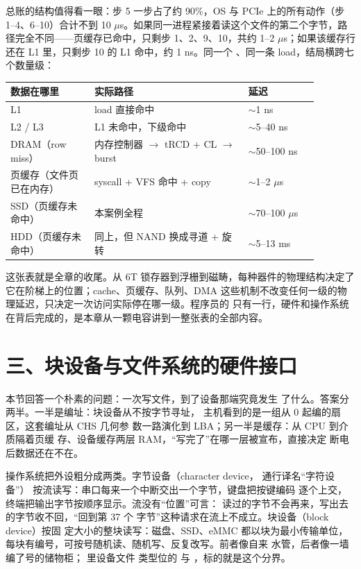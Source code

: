 总账的结构值得看一眼：步 5 一步占了约 90\%，OS 与 PCIe 上的所有动作（步 1--4、6--10）合计不到 10 $\mu$s。如果同一进程紧接着读这个文件的第二个字节，路径完全不同——页缓存已命中，只剩步 1、2、9、10，共约 1--2 $\mu$s；如果该缓存行还在 L1 里，只剩步 10 的 L1 命中，约 1 ns。同一个 、同一条 load，结局横跨七个数量级：

\begin{longtable}{L{0.24\linewidth}L{0.44\linewidth}L{0.20\linewidth}}
\toprule
数据在哪里 & 实际路径 & 延迟 \\
\midrule
L1 & load 直接命中 & $\sim$1 ns \\\tablerowrule
L2 / L3 & L1 未命中，下级命中 & $\sim$5--40 ns \\\tablerowrule
DRAM（row miss） & 内存控制器 $\to$ tRCD + CL $\to$ burst & $\sim$50--100 ns \\\tablerowrule
页缓存（文件页已在内存） & syscall + VFS 命中 + copy & $\sim$1--2 $\mu$s \\\tablerowrule
SSD（页缓存未命中） & 本案例全程 & $\sim$70--100 $\mu$s \\\tablerowrule
HDD（页缓存未命中） & 同上，但 NAND 换成寻道 + 旋转 & $\sim$5--13 ms \\
\bottomrule
\end{longtable}

这张表就是全章的收尾。从 6T 锁存器到浮栅到磁畴，每种器件的物理结构决定了它在阶梯上的位置；cache、页缓存、队列、DMA 这些机制不改变任何一级的物理延迟，只决定一次访问实际停在哪一级。程序员的  只有一行，硬件和操作系统在背后完成的，是本章从一颗电容讲到一整张表的全部内容。
\section{三、块设备与文件系统的硬件接口}

本节回答一个朴素的问题：一次写文件，到了设备那端究竟发生
了什么。答案分两半。一半是编址：块设备从不按字节寻址，
主机看到的是一组从 0 起编的扇区，这套编址从 CHS 几何参
数一路演化到 LBA；另一半是缓存：从 CPU 到介质隔着页缓
存、设备缓存两层 RAM，“写完了”在哪一层被宣布，直接决定
断电后数据还在不在。

操作系统把外设粗分成两类。字节设备（character device，
通行译名“字符设备”）
按流读写：串口每来一个中断交出一个字节，键盘把按键编码
逐个上交，终端把输出字节按顺序显示。流没有“位置”可言：
读过的字节不会再来，写出去的字节收不回，“回到第 37 个
字节”这种请求在流上不成立。块设备（block device）按固
定大小的整块读写：磁盘、SSD、eMMC 都以块为最小传输单位，
每块有编号，可按号随机读、随机写、反复改写。前者像自来
水管，后者像一墙编了号的储物柜； 里设备文件
类型位的  与 ，标的就是这个分界。

